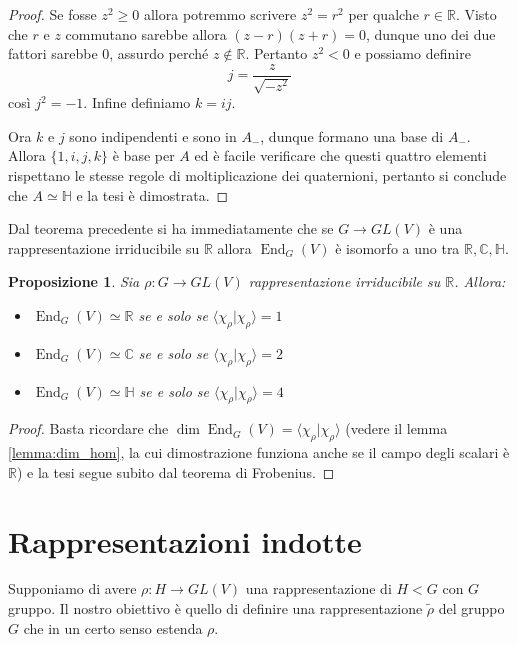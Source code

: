 \documentclass[11pt]{article}
\theoremstyle{plain}
\newtheorem{prop}[thm]{Proposizione}
\theoremstyle{definition}
\theoremstyle{remark}
\newcommand{\C}{\mathbb{C}}
\newcommand{\R}{\mathbb{R}}
\newcommand{\HH}{\mathbb{H}}
\DeclareMathOperator{\End}{End}
\DeclareMathOperator{\iso}{\simeq}
\begin{document}
\begin{proof}
Se fosse $z^2 \ge 0$ allora potremmo scrivere $z^2=r^2$ per qualche $r\in\R$.
Visto che $r$ e $z$ commutano sarebbe allora $(z-r)(z+r)=0$, dunque uno dei due fattori sarebbe $0$, assurdo perché $z\not\in\R$. Pertanto $z^2 < 0$ e possiamo definire
\[j = \frac{z}{\sqrt{-z^2}}\]
così $j^2 = -1$. Infine definiamo $k = ij$.

Ora $k$ e $j$ sono indipendenti e sono in $A_-$, dunque formano una base di $A_-$. Allora $\{1,i,j,k\}$ è base per $A$ ed è facile
verificare che questi quattro elementi rispettano le stesse regole di moltiplicazione dei quaternioni, pertanto si conclude che $A\iso\HH$ e la tesi è dimostrata.


\end{proof}




Dal teorema precedente si ha immediatamente che se $G\to GL(V)$ è una rappresentazione irriducibile su $\R$ allora $\End_G(V)$ è isomorfo a uno
tra $\R, \C, \HH$.

\begin{prop}
Sia $\rho:G\to GL(V)$ rappresentazione irriducibile su $\R$. Allora:
\begin{itemize}
\item $\End_G(V) \iso \R$ se e solo se $\langle\chi_\rho|\chi_\rho\rangle = 1$
\item $\End_G(V) \iso \C$ se e solo se $\langle\chi_\rho|\chi_\rho\rangle = 2$
\item $\End_G(V) \iso \HH$ se e solo se $\langle\chi_\rho|\chi_\rho\rangle = 4$
\end{itemize}
\end{prop}
\begin{proof}
Basta ricordare che $\dim \End_G(V) = \langle\chi_\rho|\chi_\rho\rangle$ (vedere il lemma \ref{lemma:dim_hom}, la cui dimostrazione funziona
anche se il campo degli scalari è $\R$) e la tesi segue subito dal teorema di Frobenius.
\end{proof}










\newpage
\section{Rappresentazioni indotte}
Supponiamo di avere $\rho:H\rightarrow GL(V)$ una rappresentazione di $H<G$ con $G$ gruppo.
Il nostro obiettivo è quello di definire una rappresentazione $\widetilde{\rho}$ del gruppo $G$ che in un certo senso estenda $\rho$.
\end{document}
